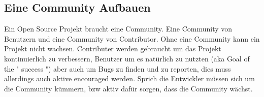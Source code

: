 \subsection{Eine Community Aufbauen} \label{ssec:Eine Community Aufbauen}

\rawidea


\noindent
Ein Open Source Projekt braucht eine Community.
Eine Community von Benutzern und eine Community von Contributor. Ohne eine Community kann ein Projekt
nicht wachsen. Contributer werden gebraucht um das Projekt kontinuierlich zu verbessern, Benutzer um
es natürlich zu nutzten (aka Goal of the " success ") aber auch um Bugs zu finden und zu reporten,
dies muss allerdings auch aktive encouraged werden. \cite{bangerthWhatMakesComputational2013} 
Sprich die Entwickler müssen sich um die
Community kümmern, bzw aktiv dafür sorgen, dass die Community wächst. 



